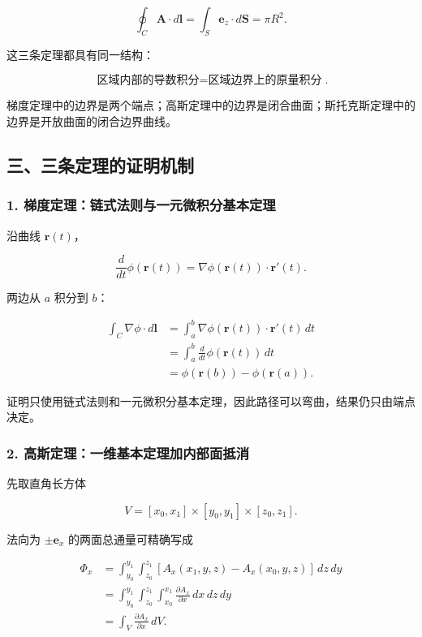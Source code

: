 \[
\oint_C\mathbf A\cdot d\mathbf l
=
\int_S\mathbf e_z\cdot d\mathbf S
=\pi R^2.
\]

这三条定理都具有同一结构：

\[
\boxed{
\text{区域内部的导数积分}
=
\text{区域边界上的原量积分}
}.
\]

梯度定理中的边界是两个端点；高斯定理中的边界是闭合曲面；斯托克斯定理中的边界是开放曲面的闭合边界曲线。

\subsection{三、三条定理的证明机制}\label{m1:ux4e09ux4e09ux6761ux5b9aux7406ux7684ux8bc1ux660eux673aux5236}

\subsubsection{1.
梯度定理：链式法则与一元微积分基本定理}\label{m1:ux68afux5ea6ux5b9aux7406ux94feux5f0fux6cd5ux5219ux4e0eux4e00ux5143ux5faeux79efux5206ux57faux672cux5b9aux7406}

沿曲线 \(\mathbf r(t)\)，

\[
\frac d{dt}\phi(\mathbf r(t))
=
\nabla\phi(\mathbf r(t))\cdot\mathbf r'(t).
\]

两边从 \(a\) 积分到 \(b\)：

\[
\begin{aligned}
\int_C\nabla\phi\cdot d\mathbf l
&=
\int_a^b
\nabla\phi(\mathbf r(t))\cdot\mathbf r'(t)\,dt\\
&=
\int_a^b
\frac d{dt}\phi(\mathbf r(t))\,dt\\
&=
\phi(\mathbf r(b))-\phi(\mathbf r(a)).
\end{aligned}
\]

证明只使用链式法则和一元微积分基本定理，因此路径可以弯曲，结果仍只由端点决定。

\subsubsection{2.
高斯定理：一维基本定理加内部面抵消}\label{m1:ux9ad8ux65afux5b9aux7406ux4e00ux7ef4ux57faux672cux5b9aux7406ux52a0ux5185ux90e8ux9762ux62b5ux6d88}

先取直角长方体

\[
V=[x_0,x_1]\times[y_0,y_1]\times[z_0,z_1].
\]

法向为 \(\pm\mathbf e_x\) 的两面总通量可精确写成

\[
\begin{aligned}
\Phi_x
&=
\int_{y_0}^{y_1}\int_{z_0}^{z_1}
\left[
A_x(x_1,y,z)-A_x(x_0,y,z)
\right]\,dz\,dy\\
&=
\int_{y_0}^{y_1}\int_{z_0}^{z_1}
\int_{x_0}^{x_1}
\frac{\partial A_x}{\partial x}\,dx\,dz\,dy\\
&=
\int_V\frac{\partial A_x}{\partial x}\,dV.
\end{aligned}
\]

